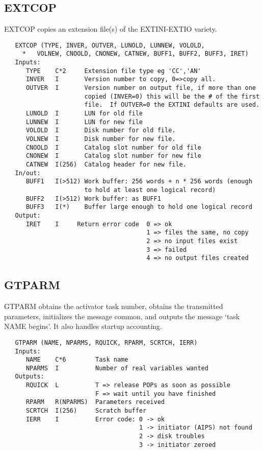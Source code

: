 \subsection{EXTCOP}
EXTCOP copies an extension file(s) of the EXTINI-EXTIO variety.
\begin{verbatim}
   EXTCOP (TYPE, INVER, OUTVER, LUNOLD, LUNNEW, VOLOLD,
     *   VOLNEW, CNOOLD, CNONEW, CATNEW, BUFF1, BUFF2, BUFF3, IRET)
   Inputs:
      TYPE    C*2     Extension file type eg 'CC','AN'
      INVER   I       Version number to copy, 0=>copy all.
      OUTVER  I       Version number on output file, if more than one
                      copied (INVER=0) this will be the # of the first
                      file.  If OUTVER=0 the EXTINI defaults are used.
      LUNOLD  I       LUN for old file
      LUNNEW  I       LUN for new file
      VOLOLD  I       Disk number for old file.
      VOLNEW  I       Disk number for new file.
      CNOOLD  I       Catalog slot number for old file
      CNONEW  I       Catalog slot number for new file
      CATNEW  I(256)  Catalog header for new file.
   In/out:
      BUFF1   I(>512) Work buffer: 256 words + n * 256 words (enough
                      to hold at least one logical record)
      BUFF2   I(>512) Work buffer: as BUFF1
      BUFF3   I(*)    Buffer large enough to hold one logical record
   Output:
      IRET    I     Return error code  0 => ok
                                       1 => files the same, no copy
                                       2 => no input files exist
                                       3 => failed
                                       4 => no output files created
\end{verbatim}

\subsection{GTPARM}
GTPARM obtains the activator task number, obtains the transmitted
parameters, initializes the message common, and outputs the message
`task NAME begins'.  It also handles startup accounting.
\begin{verbatim}
   GTPARM (NAME, NPARMS, RQUICK, RPARM, SCRTCH, IERR)
   Inputs:
      NAME    C*6        Task name
      NPARMS  I          Number of real variables wanted
   Outputs:
      RQUICK  L          T => release POPs as soon as possible
                         F => wait until you have finished
      RPARM   R(NPARMS)  Parameters received
      SCRTCH  I(256)     Scratch buffer
      IERR    I          Error code: 0 -> ok
                                     1 -> initiator (AIPS) not found
                                     2 -> disk troubles
                                     3 -> initiator zeroed
\end{verbatim}

